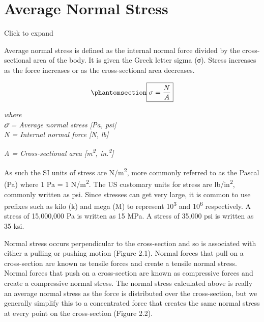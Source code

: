 \documentclass[
  letterpaper,
  DIV=11,
  numbers=noendperiod]{scrreprt}
\theoremstyle{definition}
\theoremstyle{remark}
\begin{document}
\section{Average Normal Stress}\label{sec-2.1}

Click to expand

Average normal stress is defined as the internal normal force divided by
the cross-sectional area of the body. It is given the Greek letter sigma
(σ). Stress increases as the force increases or as the cross-sectional
area decreases.

\begin{equation}\phantomsection\label{eq-2.1}{
\boxed
{\sigma=\frac{N}{A}}
}\end{equation}

\emph{where}\\
\emph{𝜎 = Average normal stress {[}Pa, psi{]}}\\
\emph{N = Internal normal force {[}N, lb{]}}

\emph{A = Cross-sectional area {[}m\textsuperscript{2},
in.\textsuperscript{2}{]}}

As such the SI units of stress are N/m\textsuperscript{2}, more commonly
referred to as the Pascal (Pa) where 1 Pa = 1 N/m\textsuperscript{2}.
The US customary units for stress are lb/in\textsuperscript{2}, commonly
written as psi. Since stresses can get very large, it is common to use
prefixes such as kilo (k) and mega (M) to represent
10\textsuperscript{3} and 10\textsuperscript{6} respectively. A stress
of 15,000,000 Pa is written as 15 MPa. A stress of 35,000 psi is written
as 35 ksi.

Normal stress occurs perpendicular to the cross-section and so is
associated with either a pulling or pushing motion (Figure 2.1). Normal
forces that pull on a cross-section are known as tensile forces and
create a tensile normal stress. Normal forces that push on a
cross-section are known as compressive forces and create a compressive
normal stress. The normal stress calculated above is really an average
normal stress as the force is distributed over the cross-section, but we
generally simplify this to a concentrated force that creates the same
normal stress at every point on the cross-section (Figure 2.2).
\end{document}
